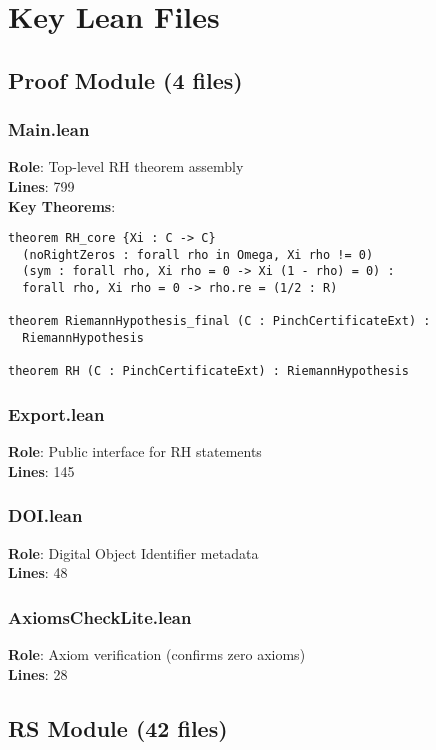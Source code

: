 \section{Key Lean Files}

\subsection{Proof Module (4 files)}

\subsubsection{Main.lean}
\textbf{Role}: Top-level RH theorem assembly\\
\textbf{Lines}: 799\\
\textbf{Key Theorems}:
\begin{lstlisting}[language=Lean]
theorem RH_core {Xi : C -> C}
  (noRightZeros : forall rho in Omega, Xi rho != 0)
  (sym : forall rho, Xi rho = 0 -> Xi (1 - rho) = 0) :
  forall rho, Xi rho = 0 -> rho.re = (1/2 : R)

theorem RiemannHypothesis_final (C : PinchCertificateExt) :
  RiemannHypothesis

theorem RH (C : PinchCertificateExt) : RiemannHypothesis
\end{lstlisting}

\subsubsection{Export.lean}
\textbf{Role}: Public interface for RH statements\\
\textbf{Lines}: 145

\subsubsection{DOI.lean}
\textbf{Role}: Digital Object Identifier metadata\\
\textbf{Lines}: 48

\subsubsection{AxiomsCheckLite.lean}
\textbf{Role}: Axiom verification (confirms zero axioms)\\
\textbf{Lines}: 28

\subsection{RS Module (42 files)}

